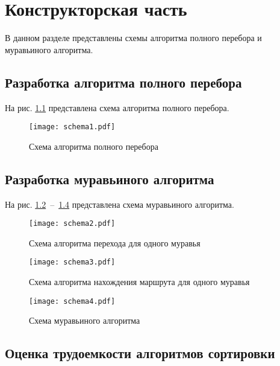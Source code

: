 \chapter{Конструкторская часть}

В данном разделе представлены схемы алгоритма полного перебора и муравьиного алгоритма.

\section{Разработка алгоритма полного перебора}
На рис. \ref{img:schema1} представлена схема алгоритма полного перебора.

\begin{figure}[h!]
\centering
    \texttt{[image: schema1.pdf]}
    \caption{Схема алгоритма полного перебора}
    \label{img:schema1}	
\end{figure}

\section{Разработка муравьиного алгоритма}
На рис. \ref{img:schema2}~--~\ref{img:schema4} представлена схема муравьиного алгоритма.

\newpage

\begin{figure}[h!]
\centering
    \texttt{[image: schema2.pdf]}
    \caption{Схема алгоритма перехода для одного муравья}
    \label{img:schema2}	
\end{figure}

\newpage

\begin{figure}[h!]
\centering
    \texttt{[image: schema3.pdf]}
    \caption{Схема алгоритма нахождения маршрута для одного муравья}
    \label{img:schema3}	
\end{figure}

\newpage

\begin{figure}[h!]
\centering
    \texttt{[image: schema4.pdf]}
    \caption{Схема муравьиного алгоритма}
    \label{img:schema4}	
\end{figure}

\newpage

\section{Оценка трудоемкости алгоритмов сортировки}

